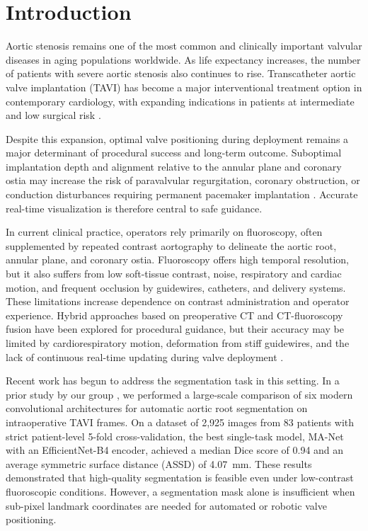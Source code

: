\documentclass[oneside,pdflatex,sn-mathphys-num]{sn-jnl}
\begin{document}
\section{Introduction}\label{sec:introduction}

Aortic stenosis remains one of the most common and clinically important valvular diseases in aging populations worldwide. As life expectancy increases, the number of patients with severe aortic stenosis also continues to rise. Transcatheter aortic valve implantation (TAVI) has become a major interventional treatment option in contemporary cardiology, with expanding indications in patients at intermediate and low surgical risk \cite{otto2020_guideline,vahanian2021_guidelines,leon2019_partner3}.

Despite this expansion, optimal valve positioning during deployment remains a major determinant of procedural success and long-term outcome. Suboptimal implantation depth and alignment relative to the annular plane and coronary ostia may increase the risk of paravalvular regurgitation, coronary obstruction, or conduction disturbances requiring permanent pacemaker implantation \cite{pibarot2021_pvl,jilaihawi2022_coronary,kammler2016_implantdepth}. Accurate real-time visualization is therefore central to safe guidance.

In current clinical practice, operators rely primarily on fluoroscopy, often supplemented by repeated contrast aortography to delineate the aortic root, annular plane, and coronary ostia. Fluoroscopy offers high temporal resolution, but it also suffers from low soft-tissue contrast, noise, respiratory and cardiac motion, and frequent occlusion by guidewires, catheters, and delivery systems. These limitations increase dependence on contrast administration and operator experience. Hybrid approaches based on preoperative CT and CT-fluoroscopy fusion have been explored for procedural guidance, but their accuracy may be limited by cardiorespiratory motion, deformation from stiff guidewires, and the lack of continuous real-time updating during valve deployment \cite{vernikouskaya2017_imageguidance,vernikouskaya2018_registration}.

Recent work has begun to address the segmentation task in this setting. In a prior study by our group \cite{laptev2025_aorticroot}, we performed a large-scale comparison of six modern convolutional architectures for automatic aortic root segmentation on intraoperative TAVI frames. On a dataset of 2,925 images from 83 patients with strict patient-level 5-fold cross-validation, the best single-task model, MA-Net with an EfficientNet-B4 encoder, achieved a median Dice score of 0.94 and an average symmetric surface distance (ASSD) of 4.07~mm. These results demonstrated that high-quality segmentation is feasible even under low-contrast fluoroscopic conditions. However, a segmentation mask alone is insufficient when sub-pixel landmark coordinates are needed for automated or robotic valve positioning.
\end{document}
